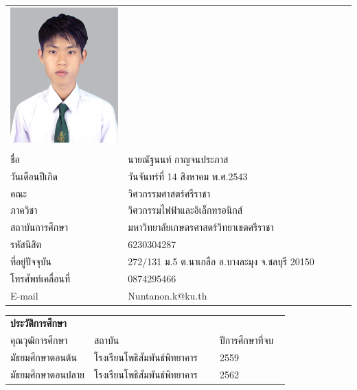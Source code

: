 \begin{center}
\begin{longtable}{@{}p{0.34\linewidth}@{}p{0.66\linewidth}@{}}
\includegraphics[scale=0.2,valign=c]{Chapters/img/nisit img/6230304287.jpg} & \\
    &\\
	ชื่อ							& นายณัฐนนท์ กาญจนประภาส\\
	วันเดือนปีเกิด						& วันจันทร์ที่ 14 สิงหาคม พ.ศ.2543\\
	คณะ							& วิศวกรรมศาสตร์ศรีราชา\\
	ภาควิชา							& วิศวกรรมไฟฟ้าและอิเล็กทรอนิกส์\\
	สถาบันการศึกษา						& มหาวิทยาลัยเกษตรศาสตร์วิทยาเขตศรีราชา\\
	รหัสนิสิต						& 6230304287\\
	ที่อยู่ปัจจุบัน						& 272/131 ม.5 ต.นาเกลือ อ.บางละมุง จ.ชลบุรี 20150\\
	โทรศัพท์เคลื่อนที่					& 0874295466\\
	E-mail						& Nuntanon.k@ku.th\\
\end{longtable}

\begin{longtable}{@{}p{0.3\linewidth}@{}p{0.45\linewidth}@{}p{0.25\linewidth}}
	\textbf{ประวัติการศึกษา} & &\\
	คุณวุฒิการศึกษา		&	สถาบัน				&	ปีการศึกษาที่จบ \\\hline
	มัธยมศึกษาตอนต้น	&	โรงเรียนโพธิสัมพันธ์พิทยาคาร	&	2559 	\\
	มัธยมศึกษาตอนปลาย	&	โรงเรียนโพธิสัมพันธ์พิทยาคาร	&	2562 	\\
\end{longtable}
\end{center}
